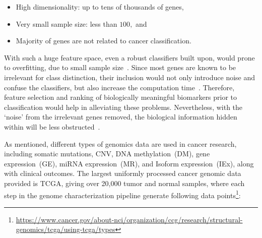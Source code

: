 \vspace{-2mm}
\begin{itemize}[noitemsep]
    \item High dimensionality: up to tens of thousands of genes,
    \item Very small sample size: less than $100,$ and
    \item Majority of genes are not related to cancer classification.
\end{itemize}
\vspace{-2mm}

\hspace*{3.5mm} With such a huge feature space, even a robust classifiers built upon, would prone to overfitting, due to small sample size~\cite{lu2003cancer}. Since most genes are known to be irrelevant for class distinction, their inclusion would not only introduce noise and confuse the classifiers, but also increase the computation time~\cite{lu2003cancer}. Therefore, feature selection and ranking of biologically meaningful biomarkers prior to classification would help in alleviating these problems. Nevertheless, with the `noise' from the irrelevant genes removed, the biological information hidden within will be less  obstructed~\cite{lu2003cancer}. 

\hspace*{3.5mm} 
As mentioned, different types of genomics data are used in cancer research, including somatic mutations, CNV, DNA methylation~(DM), gene expression~(GE), miRNA expression~(MR), and Isoform expression~(IEx), along with clinical outcomes. The largest uniformly processed cancer genomic data provided is TCGA, giving over 20,000 tumor and normal samples, where each step in the genome characterization pipeline generate following data points\footnote{\url{https://www.cancer.gov/about-nci/organization/ccg/research/structural-genomics/tcga/using-tcga/types}}:

